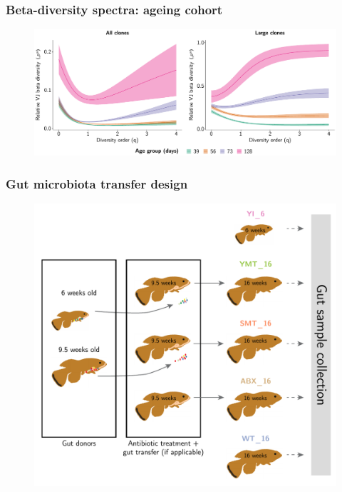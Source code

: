 \documentclass[presentation]{beamer}
\newlength{\slideheight}
\begin{document}
\begin{frame}
\frametitle{Beta-diversity spectra: ageing cohort}
\begin{figure}
\includegraphics[width=\textwidth]{figs/pdf/ageing-vj-diversity-beta}
\end{figure}
\end{frame}

\begin{frame}
\frametitle{Gut microbiota transfer design}
\begin{figure}
\includegraphics[height=\slideheight]{figs/pdf/extra/gut-transfer-design}
\end{figure}
\end{frame}
\end{document}
